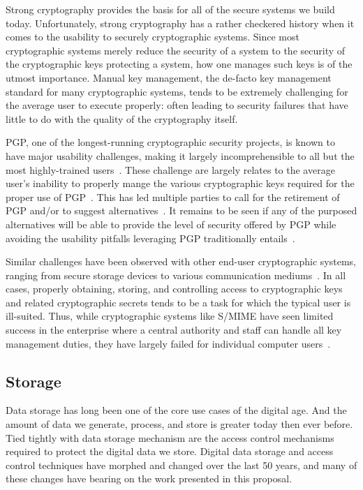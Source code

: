 Strong cryptography provides the basis for all of the secure systems
we build today. Unfortunately, strong cryptography has a rather
checkered history when it comes to the usability to securely
cryptographic systems. Since most cryptographic systems merely reduce
the security of a system to the security of the cryptographic keys
protecting a system, how one manages such keys is of the utmost
importance. Manual key management, the de-facto key management
standard for many cryptographic systems, tends to be extremely
challenging for the average user to execute properly: often leading to
security failures that have little to do with the quality of the
cryptography itself.

PGP, one of the longest-running cryptographic security projects, is
known to have major usability challenges, making it largely
incomprehensible to all but the most highly-trained
users~\cite{Whitten1999}. These challenge are largely relates to the
average user's inability to properly mange the various cryptographic
keys required for the proper use of PGP~\cite{green-challenge}. This
has led multiple parties to call for the retirement of PGP and/or to
suggest alternatives~\cite{mailpile, openwhisper, google-endtoend}. It
remains to be seen if any of the purposed alternatives will be able to
provide the level of security offered by PGP while avoiding the
usability pitfalls leveraging PGP traditionally
entails~\cite{green-pgp}.

Similar challenges have been observed with other end-user
cryptographic systems, ranging from secure storage devices to various
communication mediums~\cite{Sweikata2009}. In all cases, properly
obtaining, storing, and controlling access to cryptographic keys and
related cryptographic secrets tends to be a task for which the typical
user is ill-suited. Thus, while cryptographic systems like S/MIME have
seen limited success in the enterprise where a central authority and
staff can handle all key management duties, they have largely failed
for individual computer users~\cite{ramsdell-rfc5751}.

\subsection{Storage}

Data storage has long been one of the core use cases of the digital
age. And the amount of data we generate, process, and store is greater
today then ever before. Tied tightly with data storage mechanism are
the access control mechanisms required to protect the digital data we
store. Digital data storage and access control techniques have morphed
and changed over the last 50 years, and many of these changes have
bearing on the work presented in this proposal.

